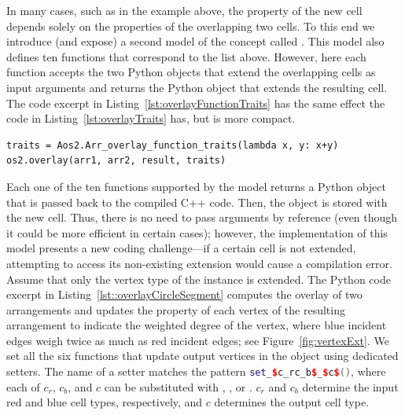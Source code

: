 In many cases, such as in the example above, the property of the new
cell depends solely on the properties of the overlapping two cells. To
this end we introduce (and expose) a second model of the
 concept called
. This model also defines
ten functions that correspond to the list above. However, here each
function accepts the two Python objects that extend the overlapping
cells as input arguments and returns the Python object that extends
the resulting cell. The code excerpt in
Listing~\ref{lst:overlayFunctionTraits} has the same effect the code
in Listing~\ref{lst:overlayTraits} has, but is more compact.

\begin{lstfloat}
  \begin{lstlisting}[style=pythonFramedStyle,basicstyle=\normalsize,
                     label={lst:overlayFunctionTraits},
                     caption={Computing the map overlay of two arrangements using the functional overlay traits.}]
traits = Aos2.Arr_overlay_function_traits(lambda x, y: x+y)
os2.overlay(arr1, arr2, result, traits)
  \end{lstlisting}
\end{lstfloat}

Each one of the ten functions supported by the
 model returns a Python
object that is passed back to the compiled C++ code. Then, the object
is stored with the new cell. Thus, there is no need to pass arguments
by reference (even though it could be more efficient in certain
cases); however, the implementation of this model presents a new
coding challenge---if a certain cell is not extended, attempting to
access its non-existing extension would cause a compilation error.
%
Assume that only the vertex type of the 
instance is extended. The Python code excerpt in
Listing~\ref{lst::overlayCircleSegment} computes the overlay of two
arrangements and updates the property of each vertex of the resulting
arrangement to indicate the weighted degree of the vertex, where blue
incident edges weigh twice as much as red incident edges; see
Figure~\ref{fig:vertexExt}. We set all the six functions that update
output vertices in the 
object using dedicated setters. The name of a setter matches the
pattern
\lstinline[language={C++},mathescape=true,columns=fixed]{set_$c_rc_b$_$c$()},
where each of $c_r$, $c_b$, and $c$ can be substituted with
, , or . $c_r$ and
$c_b$ determine the input red and blue cell types, respectively, and
$c$ determines the output cell type.

